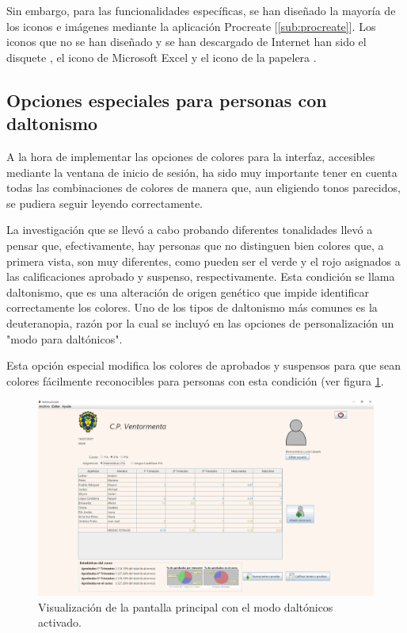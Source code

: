 Sin embargo, para las funcionalidades específicas, se han diseñado la mayoría de los iconos e imágenes mediante la aplicación Procreate [\ref{sub:procreate}]. Los iconos que no se han diseñado y se han descargado de Internet han sido el disquete \cite{disquete}, el icono de Microsoft Excel \cite{excelicon} y el icono de la papelera \cite{iconsforfree}.

\subsection{Opciones especiales para personas con daltonismo}
A la hora de implementar las opciones de colores para la interfaz, accesibles mediante la ventana de inicio de sesión, ha sido muy importante tener en cuenta todas las combinaciones de colores de manera que, aun eligiendo tonos parecidos, se pudiera seguir leyendo correctamente.

La investigación que se llevó a cabo probando diferentes tonalidades  llevó a pensar que, efectivamente, hay personas que no distinguen bien colores que, a primera vista, son muy diferentes, como pueden ser el verde y el rojo asignados a las calificaciones aprobado y suspenso, respectivamente. Esta condición se llama daltonismo, que es una alteración de origen genético que impide identificar correctamente los colores. Uno de los tipos de daltonismo más comunes es la deuteranopia, razón por la cual se incluyó en las opciones de personalización un "modo para daltónicos".

Esta opción especial modifica los colores de aprobados y suspensos para que sean colores fácilmente reconocibles para personas con esta condición (ver figura \ref{Fig:appdaltonicos}.

\begin{figure}[h]
\centering\includegraphics[width=1\linewidth]{figs/appdaltonicos.png}
\caption{Visualización de la pantalla principal con el modo daltónicos activado.}
\label{Fig:appdaltonicos}
\end{figure}

